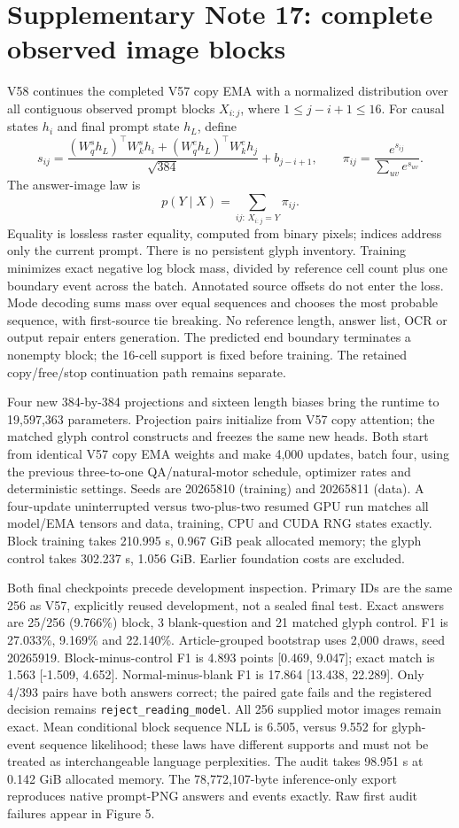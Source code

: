 \documentclass[10pt,a4paper]{article}
\begin{document}
\section*{Supplementary Note 17: complete observed image blocks}
V58 continues the completed V57 copy EMA with a normalized distribution over
all contiguous observed prompt blocks $X_{i:j}$, where $1\leq j-i+1\leq16$.
For causal states $h_i$ and final prompt state $h_L$, define
\[
 s_{ij}=\frac{(W^s_qh_L)^\top W^s_kh_i+
                   (W^e_qh_L)^\top W^e_kh_j}{\sqrt{384}}+b_{j-i+1},
 \qquad \pi_{ij}=\frac{e^{s_{ij}}}{\sum_{uv}e^{s_{uv}}}.
\]
The answer-image law is
\[
 p(Y\mid X)=\sum_{ij:\,X_{i:j}=Y}\pi_{ij}.
\]
Equality is lossless raster equality, computed from binary pixels; indices
address only the current prompt. There is no persistent glyph inventory.
Training minimizes exact negative log block mass, divided by reference cell
count plus one boundary event across the batch. Annotated source offsets do
not enter the loss. Mode decoding sums mass over equal sequences and chooses
the most probable sequence, with first-source tie breaking. No reference
length, answer list, OCR or output repair enters generation. The predicted
end boundary terminates a nonempty block; the 16-cell support is fixed before
training. The retained copy/free/stop continuation path remains separate.

Four new 384-by-384 projections and sixteen length biases bring the runtime
to 19,597,363 parameters. Projection pairs initialize from V57 copy attention;
the matched glyph control constructs and freezes the same new heads. Both
start from identical V57 copy EMA weights and make 4,000 updates, batch four,
using the previous three-to-one QA/natural-motor schedule, optimizer rates
and deterministic settings. Seeds are 20265810 (training) and 20265811 (data).
A four-update uninterrupted versus two-plus-two resumed GPU run matches all
model/EMA tensors and data, training, CPU and CUDA RNG states exactly.
Block training takes 210.995 s, 0.967 GiB peak allocated memory; the glyph
control takes 302.237 s, 1.056 GiB. Earlier foundation costs are excluded.

Both final checkpoints precede development inspection. Primary IDs are the
same 256 as V57, explicitly reused development, not a sealed final test.
Exact answers are 25/256 (9.766\%) block, 3 blank-question and 21 matched glyph control.
F1 is 27.033\%, 9.169\% and 22.140\%. Article-grouped bootstrap uses 2,000
draws, seed 20265919. Block-minus-control F1 is 4.893 points [0.469, 9.047];
exact match is 1.563 [-1.509, 4.652]. Normal-minus-blank F1 is 17.864
[13.438, 22.289]. Only 4/393 pairs have both answers correct; the paired gate
fails and the registered decision remains \texttt{reject\_reading\_model}.
All 256 supplied motor images remain exact. Mean conditional block sequence
NLL is 6.505, versus 9.552 for glyph-event sequence likelihood; these laws have
different supports and must not be treated as interchangeable language
perplexities. The audit takes 98.951 s at 0.142 GiB allocated memory.
The 78,772,107-byte inference-only export reproduces native prompt-PNG
answers and events exactly. Raw first audit failures appear in Figure 5.
\end{document}
